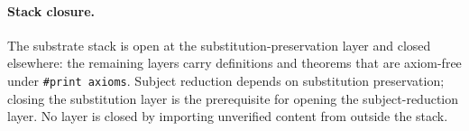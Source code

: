 \paragraph{Stack closure.} The substrate stack is open at the
substitution-preservation layer and closed elsewhere: the remaining layers
carry definitions and theorems that are axiom-free under
\texttt{\#print axioms}. Subject reduction depends on substitution
preservation; closing the substitution layer is the prerequisite for opening
the subject-reduction layer. No layer is closed by importing unverified
content from outside the stack.
